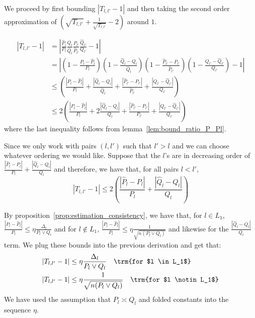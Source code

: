 \documentclass{article}
\begin{document}
We proceed by first bounding $|T_{l,l'} - 1|$ and then taking the second order approximation of $\left( \sqrt{T_{l,l'}} + \frac{1}{\sqrt{T_{l,l'}}} - 2 \right)$ around $1$. 

\begin{align*}
|T_{l,l'} - 1| &= \left| \frac{\hat{P}_l}{P_l} \frac{Q_l}{\hat{Q}_l} 
      \frac{P_{l'}}{\hat{P}_{l'}} \frac{\hat{Q}_{l'}}{Q_{l'}} - 1 \right| \\
 &= \left| \left( 1 - \frac{P_l - \hat{P}_l}{P_l} \right)
    \left( 1 - \frac{\hat{Q}_l - Q_l}{\hat{Q}_l} \right)
   \left( 1- \frac{\hat{P}_{l'} - P_{l'}}{\hat{P}_{l'}}\right)
   \left( 1 -  \frac{Q_{l'}- \hat{Q}_{l'}}{Q_{l'}} \right) -1 \right| \\
&\leq \left( \frac{|P_l - \hat{P}_l|}{P_l} +  \frac{|\hat{Q}_l - Q_l|}{\hat{Q}_l}
           +   \frac{| \hat{P}_{l'} - P_{l'}|}{\hat{P}_{l'}} +
               \frac{| Q_{l'} - \hat{Q}_{l'} | }{Q_{l'}} \right) \\
& \leq 2\left( \frac{|P_l - \hat{P}_l|}{P_l} +  2\frac{|\hat{Q}_l - Q_l|}{Q_l}
           +   \frac{| \hat{P}_{l'} - P_{l'}|}{P_{l'}} +
               \frac{| Q_{l'} - \hat{Q}_{l'} | }{Q_{l'}} \right) 
\end{align*}
where the last inequality follows from lemma~\ref{lem:bound_ratio_P_Pl}.

Since we only work with pairs $(l, l')$ such that $l' > l$ and we can choose whatever ordering we would like. Suppose that the $l$'s are in decreasing order of $\frac{|\hat{P}_l - P_l|}{P_l} + \frac{|\hat{Q}_l - Q_l|}{Q_l}$ and therefore, we have that, for all pairs $l < l'$, 
\[
| T_{l,l'} - 1 | \leq 2 
    \left( \frac{|\hat{P}_l - P_l|}{P_l} + \frac{|\hat{Q}_l - Q_l|}{Q_l} \right)
\]

By proposition~\ref{prop:estimation_consistency}, we have that, for $l \in L_1$, $\frac{|P_l - \hat{P}_l|}{P_l} \leq \eta \frac{\Delta_l}{P_l \vee Q_l}$ and for $l \notin L_1$, $\frac{|P_l - \hat{P}_l|}{P_l} \leq \eta \frac{1}{\sqrt{n (P_l \vee Q_l)}}$ and likewise for the $\frac{|\hat{Q}_l - Q_l|}{Q_l}$ term. We plug these bounds into the previous derivation and get that:
\begin{align*}
|T_{l,l'} - 1|  &\leq \eta  \frac{\Delta_l}{P_l \vee Q_l}  \quad \trm{for $l \in L_1$}\\
|T_{l,l'} - 1 | &\leq \eta \frac{1}{\sqrt{ n (P_l \vee Q_l)}} \quad \trm{for $l \notin L_1$}
\end{align*}
We have used the assumption that $P_l \asymp Q_l$ and folded constants into the sequence $\eta$. 
\end{document}
